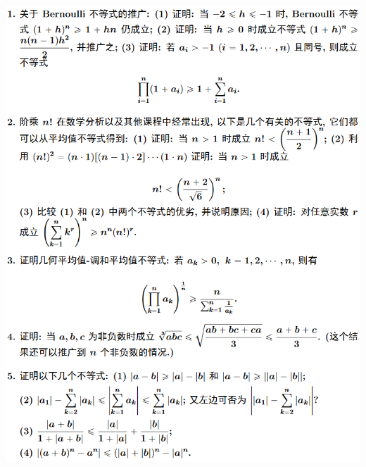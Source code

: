 \documentclass[11pt,a4paper]{ctexart}
\begin{document}
\setlength{\columnsep}{2.2em}
\setlength{\columnseprule}{1pt}
\begin{paracol}{2}








\normalsize






\includegraphics[width=\linewidth]{figure01.png}


\end{paracol}
\end{document}
